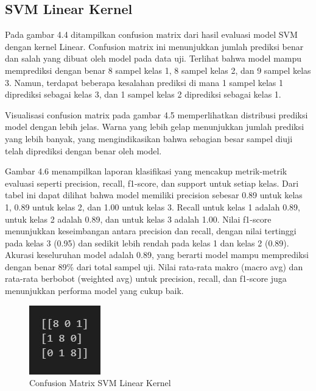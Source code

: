 \subsection{SVM Linear Kernel}
\label{sec:evalLinearKernel}
Pada gambar 4.4 ditampilkan confusion matrix dari hasil evaluasi model SVM dengan kernel Linear. Confusion matrix ini menunjukkan jumlah prediksi benar dan salah yang dibuat oleh model pada data uji. Terlihat bahwa model mampu memprediksi dengan benar 8 sampel kelas 1, 8 sampel kelas 2, dan 9 sampel kelas 3. Namun, terdapat beberapa kesalahan prediksi di mana 1 sampel kelas 1 diprediksi sebagai kelas 3, dan 1 sampel kelas 2 diprediksi sebagai kelas 1.

Visualisasi confusion matrix pada gambar 4.5 memperlihatkan distribusi prediksi model dengan lebih jelas. Warna yang lebih gelap menunjukkan jumlah prediksi yang lebih banyak, yang mengindikasikan bahwa sebagian besar sampel diuji telah diprediksi dengan benar oleh model.

Gambar 4.6 menampilkan laporan klasifikasi yang mencakup metrik-metrik evaluasi seperti precision, recall, f1-score, dan support untuk setiap kelas. Dari tabel ini dapat dilihat bahwa model memiliki precision sebesar 0.89 untuk kelas 1, 0.89 untuk kelas 2, dan 1.00 untuk kelas 3. Recall untuk kelas 1 adalah 0.89, untuk kelas 2 adalah 0.89, dan untuk kelas 3 adalah 1.00. Nilai f1-score menunjukkan keseimbangan antara precision dan recall, dengan nilai tertinggi pada kelas 3 (0.95) dan sedikit lebih rendah pada kelas 1 dan kelas 2 (0.89). Akurasi keseluruhan model adalah 0.89, yang berarti model mampu memprediksi dengan benar 89\% dari total sampel uji. Nilai rata-rata makro (macro avg) dan rata-rata berbobot (weighted avg) untuk precision, recall, dan f1-score juga menunjukkan performa model yang cukup baik.

\begin{figure} [H] \centering
  \includegraphics[scale=1]{gambar/cflinear.jpg}
  \caption{Confusion Matrix SVM Linear Kernel}
  \label{fig:evalconflinearkernel}
\end{figure}

